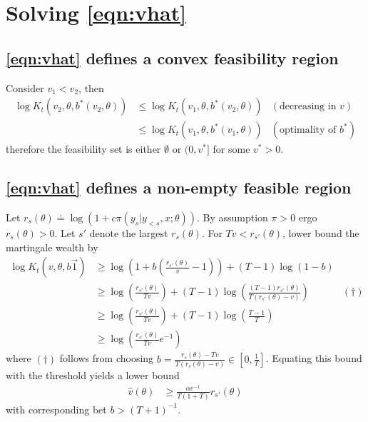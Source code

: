 \documentclass{article}
\begin{document}
\section{Solving \cref{eqn:vhat}}

\subsection{\cref{eqn:vhat} defines a convex feasibility region} \label{app:setinterval}

Consider $v_1 < v_2$, then
\begin{align*}
\log K_t\left(v_2, \theta, b^*(v_2, \theta)\right) &\leq \log K_t\left(v_1, \theta, b^*(v_2, \theta)\right) & \left( \text{decreasing in $v$} \right) \\
&\leq \log K_t\left(v_1, \theta, b^*(v_1, \theta)\right) & \left( \text{optimality of $b^*$} \right)
\end{align*}
therefore the feasibility set is either $\emptyset$ or $(0, v^*]$ for some $v^* > 0$.

\subsection{\cref{eqn:vhat} defines a non-empty feasible region} \label{app:setnonempty}

Let $r_s(\theta) \doteq \log(1 + c \pi(y_s|y_{<s},x;\theta))$.  By assumption $\pi > 0$ ergo $r_s(\theta) > 0$.  Let $s'$ denote the largest $r_s(\theta)$.  For $T v < r_{s'}(\theta)$, lower bound the martingale wealth by
\begin{align*}
\log K_t\left(v, \theta, b \vec{1}\right) &\geq \log\left(1 + b \left( \frac{r_{s'}(\theta)}{v} - 1 \right) \right) + (T - 1) \log\left(1 - b\right) \\
&\geq \log\left( \frac{ r_{s'}(\theta) } {T v} \right) + \left(T - 1\right) \log\left( \frac{ (T - 1) r_{s'}(\theta) } { T (r_{s'}(\theta) - v) } \right) & \left(\dagger\right) \\
&\geq \log\left( \frac{ r_{s'}(\theta) } {T v} \right) + \left(T - 1\right) \log\left(\frac{T - 1}{T}\right) \\
&\geq \log\left( \frac{ r_{s'}(\theta) } {T v} e^{-1} \right)
\end{align*}
where $(\dagger)$ follows from choosing $b = \frac{r_s(\theta) - T v}{T (r_s(\theta) - v)} \in \left[0, \frac{1}{T}\right]$.  Equating this bound with the threshold yields a lower bound
\begin{align*}
\hat{v}(\theta) &\geq \frac{\alpha e^{-1}}{T (1 + T)} r_{s'}(\theta)
\end{align*}
with corresponding bet $b > (T + 1)^{-1}$.
\end{document}
